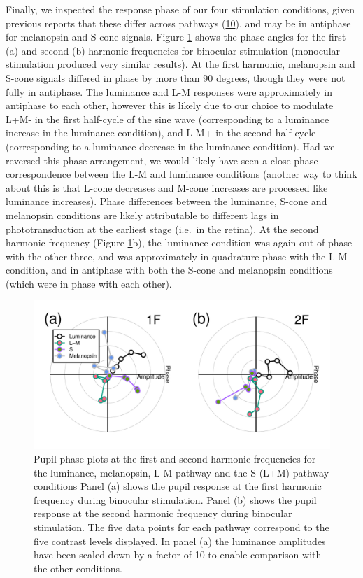 \documentclass[
]{article}
\begin{document}
Finally, we inspected the response phase of our four stimulation conditions, given previous reports that these differ across pathways (\protect\hyperlink{ref-Spitschan2014}{10}), and may be in antiphase for melanopsin and S-cone signals. Figure \ref{fig:phaseplots} shows the phase angles for the first (a) and second (b) harmonic frequencies for binocular stimulation (monocular stimulation produced very similar results). At the first harmonic, melanopsin and S-cone signals differed in phase by more than 90 degrees, though they were not fully in antiphase. The luminance and L-M responses were approximately in antiphase to each other, however this is likely due to our choice to modulate L+M- in the first half-cycle of the sine wave (corresponding to a luminance increase in the luminance condition), and L-M+ in the second half-cycle (corresponding to a luminance decrease in the luminance condition). Had we reversed this phase arrangement, we would likely have seen a close phase correspondence between the L-M and luminance conditions (another way to think about this is that L-cone decreases and M-cone increases are processed like luminance increases). Phase differences between the luminance, S-cone and melanopsin conditions are likely attributable to different lags in phototransduction at the earliest stage (i.e.~in the retina). At the second harmonic frequency (Figure \ref{fig:phaseplots}b), the luminance condition was again out of phase with the other three, and was approximately in quadrature phase with the L-M condition, and in antiphase with both the S-cone and melanopsin conditions (which were in phase with each other).

\begin{figure}

{\centering \includegraphics{Figures/phaseplots} 

}

\caption{Pupil phase plots at the first and second harmonic frequencies for the luminance, melanopsin, L-M pathway and the S-(L+M) pathway conditions Panel (a) shows the pupil response at the first harmonic frequency during binocular stimulation. Panel (b) shows the pupil response at the second harmonic frequency during binocular stimulation. The five data points for each pathway correspond to the five contrast levels displayed. In panel (a) the luminance amplitudes have been scaled down by a factor of 10 to enable comparison with the other conditions.}\label{fig:phaseplots}
\end{figure}
\end{document}
